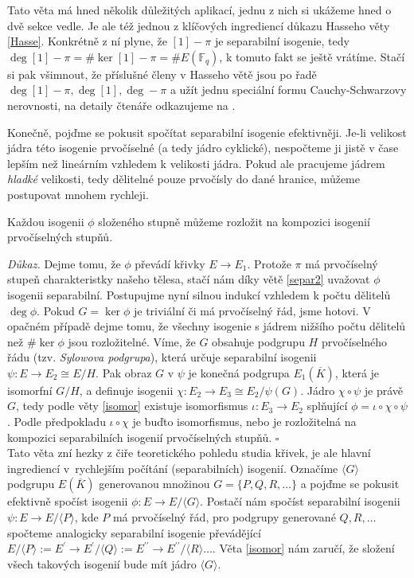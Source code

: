 \documentclass[12pt]{report}
\begin{document}
\begin{poznamka}
Tato věta má hned několik důležitých aplikací, jednu z nich si ukážeme hned o dvě sekce vedle. Je ale též jednou z klíčových ingrediencí důkazu Hasseho věty \ref{Hasse}. Konkrétně z ní plyne, že $[1]-\pi$ je separabilní isogenie, tedy $\deg [1]-\pi = \# \ker [1]-\pi = \# E(\mathbb{F}_q)$, k tomuto fakt se ještě vrátíme. Stačí si pak všimnout, že příslušné členy v Hasseho větě jsou po řadě $\deg [1] - \pi, \deg [1], \deg -\pi$ a užít jednu speciální formu Cauchy-Schwarzovy nerovnosti, na detaily čtenáře odkazujeme na \cite[Thm. V.1.1.]{Silverman}.
\end{poznamka}

Konečně, pojďme se pokusit spočítat separabilní isogenie efektivněji. Je-li velikost jádra této isogenie prvočíselné (a tedy jádro cyklické), nespočteme ji jistě v čase lepším než lineárním vzhledem k velikosti jádra. Pokud ale pracujeme jádrem \textit{hladké} velikosti, tedy dělitelné pouze prvočísly do dané hranice, můžeme postupovat mnohem rychleji. 

\begin{veta}\label{prvoo}
Každou isogenii $\phi$ složeného stupně můžeme rozložit na kompozici isogenií prvočíselných stupňů.
\end{veta}
\noindent \textit{Důkaz.} Dejme tomu, že  $\phi$ převádí křivky $E \longrightarrow E_1$. Protože $\pi$ má prvočíselný stupeň charakteristky našeho tělesa, stačí nám díky větě \ref{separ2} uvažovat $\phi$ isogenii separabilní. Postupujme nyní silnou indukcí vzhledem k počtu dělitelů $\deg \phi$. Pokud $G = \ker \phi$ je triviální či má prvočíselný řád, jsme hotovi. V opačném případě dejme tomu, že všechny isogenie s jádrem nižšího počtu dělitelů než $\# \ker \phi$ jsou rozložitelné. Víme, že $G$ obsahuje podgrupu $H$ prvočíselného řádu (tzv. \textit{Sylowova podgrupa}), která určuje separabilní isogenii $\psi : E \longrightarrow E_2 \cong E/H$. Pak obraz $G$ v $\psi$ je konečná podgrupa $E_1 (\overline{K})$, která je isomorfní $G/H$, a definuje isogenii $\chi : E_2 \longrightarrow E_3 \cong E_2/\psi(G)$. Jádro $\chi \circ \psi$ je právě $G$, tedy podle věty \ref{isomor} existuje isomorfismus $\iota : E_3 \longrightarrow E_2$ splňující $\phi = \iota \circ \chi \circ \psi$. Podle předpokladu $\iota \circ \chi$ je buďto isomorfismus, nebo je rozložitelná na kompozici separabilních isogenií prvočíselných stupňů. \hfill $\square$\\

Tato věta zní hezky z čiře teoretického pohledu studia křivek, je ale hlavní ingrediencí v~rychlejším počítání (separabilních) isogenií. Označíme $\langle G \rangle$ podgrupu $E(\overline{K})$ generovanou množinou $G = \lbrace P,Q,R,\dots \rbrace$ a pojďme se pokusit efektivně spočíst isogenii $\phi : E \longrightarrow E/ \langle G \rangle$. Postačí nám spočíst separabilní isogenii $\psi : E \longrightarrow E/\langle P \rangle$, kde $P$ má prvočíselný řád, pro podgrupy generované $Q,R, \dots$ spočteme analogicky separabilní isogenie převádějící $E/\langle P \rangle := E^\prime \longrightarrow E^\prime/\langle Q \rangle := E^{\prime \prime} \longrightarrow E^{\prime \prime}/\langle R \rangle \dots$. Věta \ref{isomor} nám zaručí, že složení všech takových isogenií bude mít jádro $\langle G \rangle$.
\end{document}
